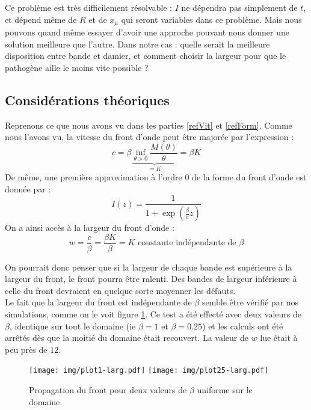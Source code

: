 \documentclass{article}
\begin{document}
Ce problème est très difficilement résolvable : $I$ ne dépendra pas simplement de $t$, et dépend même de $R$ et de $x_{\mu}$ qui seront variables dans ce problème. Mais nous pouvons quand même essayer d'avoir une approche pouvant nous donner une solution meilleure que l'autre. Dans notre cas : quelle serait la meilleure disposition entre bande et damier, et comment choisir la largeur pour que le pathogène aille le moins vite possible ?

\subsection{Considérations théoriques}
Reprenons ce que nous avons vu dans les parties \ref{refVit} et \ref{refForm}. Comme nous l'avons vu, la vitesse du front d'onde peut être majorée par l'expression :
\begin{equation}
	c=\beta\underbrace{\inf_{\theta>0} \frac{M(\theta)}{\theta} }_{=K}= \beta K
\end{equation}
De même, une première approximation à l'ordre 0 de la forme du front d'onde est donnée par :
\begin{equation}
	I(z)=\frac{1}{1+\exp\left(\frac{\beta}{c}z\right)}
\end{equation}
On a ainsi accès à la largeur du front d'onde :
\begin{equation}
	w=\frac{c}{\beta}=\frac{\beta K}{\beta}=K \text{ constante indépendante de }\beta
\end{equation}

On pourrait donc penser que si la largeur de chaque bande est supérieure à la largeur du front, le front pourra être ralenti. Des bandes de largeur inférieure à celle du front devraient en quelque sorte moyenner les défauts.\\
Le fait que la largeur du front est indépendante de $\beta$ semble être vérifié par nos simulations, comme on le voit figure \ref{figLarg}. Ce test a été effecté avec deux valeurs de $\beta$, identique sur tout le domaine (ie $\beta=1$ et $\beta=0.25$) et les calculs ont été arrêtés dès que la moitié du domaine était recouvert. La valeur de $w$ lue était à peu près de $12$.

\begin{figure}[!h]
\centering
	\texttt{[image: img/plot1-larg.pdf]}
	\texttt{[image: img/plot25-larg.pdf]}
\caption{Propagation du front pour deux valeurs de $\beta$ uniforme sur le domaine}
\label{figLarg}
\end{figure}
\end{document}
